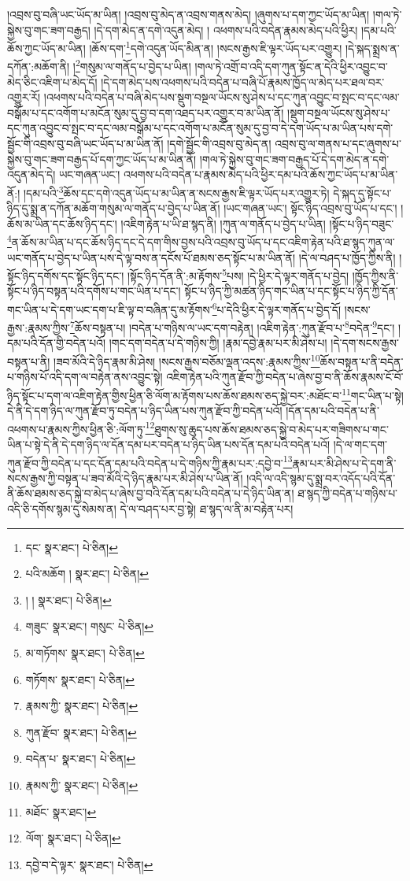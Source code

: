 །འབྲས་བུ་བཞི་ཡང་ཡོད་མ་ཡིན། །འབྲས་བུ་མེད་ན་འབྲས་གནས་མེད། །ཞུགས་པ་དག་ཀྱང་ཡོད་མ་ཡིན། །གལ་ཏེ་སྐྱེས་བུ་གང་ཟག་བརྒྱད། །དེ་དག་མེད་ན་དགེ་འདུན་མེད། །
འཕགས་པའི་བདེན་རྣམས་མེད་པའི་ཕྱིར། །དམ་པའི་ཆོས་ཀྱང་ཡོད་མ་ཡིན། །ཆོས་དག་\footnote{དང་  སྣར་ཐང་།  པེ་ཅིན། }དགེ་འདུན་ཡོད་མིན་ན། །སངས་རྒྱས་ཇི་ལྟར་ཡོད་པར་འགྱུར། །དེ་སྐད་སྨྲས་ན་དཀོན་:མཆོག་ནི། །\footnote{པའི་མཆོག །  སྣར་ཐང་།  པེ་ཅིན། }གསུམ་ལ་གནོད་པ་བྱེད་པ་ཡིན། །གལ་ཏེ་འགྲོ་བ་འདི་དག་ཀུན་སྟོང་ན་དེའི་ཕྱིར་འབྱུང་བ་མེད་ཅིང་འཇིག་པ་མེད་དོ། །དེ་དག་མེད་པས་འཕགས་པའི་བདེན་པ་བཞི་པོ་རྣམས་ཁྱོད་ལ་མེད་པར་ཐལ་བར་འགྱུར་རོ། །འཕགས་པའི་བདེན་པ་བཞི་མེད་པས་སྡུག་བསྔལ་ཡོངས་སུ་ཤེས་པ་དང་ཀུན་འབྱུང་བ་སྤང་བ་དང་ལམ་བསྒོམ་པ་དང་འགོག་པ་མངོན་སུམ་དུ་བྱ་བ་དག་འཐད་པར་འགྱུར་བ་མ་ཡིན་ནོ། །སྡུག་བསྔལ་ཡོངས་སུ་ཤེས་པ་དང་ཀུན་འབྱུང་བ་སྤང་བ་དང་ལམ་བསྒོམ་པ་དང་འགོག་པ་མངོན་སུམ་དུ་བྱ་བ་དེ་དག་ཡོད་པ་མ་ཡིན་པས་དགེ་སྦྱོང་གི་འབྲས་བུ་བཞི་ཡང་ཡོད་པ་མ་ཡིན་ནོ། །དགེ་སྦྱོང་གི་འབྲས་བུ་མེད་ན། འབྲས་བུ་ལ་གནས་པ་དང་ཞུགས་པ་སྐྱེས་བུ་གང་ཟག་བརྒྱད་པོ་དག་ཀྱང་ཡོད་པ་མ་ཡིན་ནོ། །གལ་ཏེ་སྐྱེས་བུ་གང་ཟག་བརྒྱད་པོ་དེ་དག་མེད་ན་དགེ་འདུན་མེད་དེ། ཡང་གཞན་ཡང་། འཕགས་པའི་བདེན་པ་རྣམས་མེད་པའི་ཕྱིར་དམ་པའི་ཆོས་ཀྱང་ཡོད་པ་མ་ཡིན་ནོ:། །དམ་པའི་\footnote{། །  སྣར་ཐང་།  པེ་ཅིན། }ཆོས་དང་དགེ་འདུན་ཡོད་པ་མ་ཡིན་ན་སངས་རྒྱས་ཇི་ལྟར་ཡོད་པར་འགྱུར་ཏེ། དེ་སྐད་དུ་སྟོང་པ་ཉིད་དུ་སྨྲ་ན་དཀོན་མཆོག་གསུམ་ལ་གནོད་པ་བྱེད་པ་ཡིན་ནོ། །ཡང་གཞན་ཡང་། སྟོང་ཉིད་འབྲས་བུ་ཡོད་པ་དང་། །ཆོས་མ་ཡིན་དང་ཆོས་ཉིད་དང་། །འཇིག་རྟེན་པ་ཡི་ཐ་སྙད་ནི། །ཀུན་ལ་གནོད་པ་བྱེད་པ་ཡིན། །སྟོང་པ་ཉིད་བཟུང་\footnote{གཟུང་  སྣར་ཐང་། གསུང་  པེ་ཅིན། }ན་ཆོས་མ་ཡིན་པ་དང་ཆོས་ཉིད་དང་དེ་དག་གིས་བྱས་པའི་འབྲས་བུ་ཡོད་པ་དང་འཇིག་རྟེན་པའི་ཐ་སྙད་ཀུན་ལ་ཡང་གནོད་པ་བྱེད་པ་ཡིན་པས་དེ་ལྟ་བས་ན་དངོས་པོ་ཐམས་ཅད་སྟོང་པ་མ་ཡིན་ནོ། །དེ་ལ་བཤད་པ་ཁྱོད་ཀྱིས་ནི། །སྟོང་ཉིད་དགོས་དང་སྟོང་ཉིད་དང་། །སྟོང་ཉིད་དོན་ནི་:མ་རྟོགས་\footnote{མ་གཏོགས་  སྣར་ཐང་།  པེ་ཅིན། }པས། །དེ་ཕྱིར་དེ་ལྟར་གནོད་པ་བྱེད། །ཁྱོད་ཀྱིས་ནི་སྟོང་པ་ཉིད་བསྟན་པའི་དགོས་པ་གང་ཡིན་པ་དང་། སྟོང་པ་ཉིད་ཀྱི་མཚན་ཉིད་གང་ཡིན་པ་དང་སྟོང་པ་ཉིད་ཀྱི་དོན་གང་ཡིན་པ་དེ་དག་ཡང་དག་པ་ཇི་ལྟ་བ་བཞིན་དུ་མ་རྟོགས་\footnote{གཏོགས་  སྣར་ཐང་།  པེ་ཅིན། }པ་དེའི་ཕྱིར་དེ་ལྟར་གནོད་པ་བྱེད་དོ། །སངས་རྒྱས་:རྣམས་ཀྱིས་\footnote{རྣམས་ཀྱི་  སྣར་ཐང་།  པེ་ཅིན། }ཆོས་བསྟན་པ། །བདེན་པ་གཉིས་ལ་ཡང་དག་བརྟེན། །འཇིག་རྟེན་:ཀུན་རྫོབ་པ་\footnote{ཀུན་རྫོབ་  སྣར་ཐང་།  པེ་ཅིན། }བདེན་\footnote{བདེན་པ་  སྣར་ཐང་།  པེ་ཅིན། }དང་། །དམ་པའི་དོན་གྱི་བདེན་པའོ། །གང་དག་བདེན་པ་དེ་གཉིས་ཀྱི། །རྣམ་དབྱེ་རྣམ་པར་མི་ཤེས་པ། །དེ་དག་སངས་རྒྱས་བསྟན་པ་ནི། །ཟབ་མོའི་དེ་ཉིད་རྣམ་མི་ཤེས། །སངས་རྒྱས་བཅོམ་ལྡན་འདས་:རྣམས་ཀྱིས་\footnote{རྣམས་ཀྱི་  སྣར་ཐང་།  པེ་ཅིན། }ཆོས་བསྟན་པ་ནི་བདེན་པ་གཉིས་པོ་འདི་དག་ལ་བརྟེན་ནས་འབྱུང་སྟེ། འཇིག་རྟེན་པའི་ཀུན་རྫོབ་ཀྱི་བདེན་པ་ཞེས་བྱ་བ་ནི་ཆོས་རྣམས་ངོ་བོ་ཉིད་སྟོང་པ་དག་ལ་འཇིག་རྟེན་གྱིས་ཕྱིན་ཅི་ལོག་མ་རྟོགས་པས་ཆོས་ཐམས་ཅད་སྐྱེ་བར་:མཐོང་བ་\footnote{མཐོང་  སྣར་ཐང་། }གང་ཡིན་པ་སྟེ། དེ་ནི་དེ་དག་ཉིད་ལ་ཀུན་རྫོབ་ཏུ་བདེན་པ་ཉིད་ཡིན་པས་ཀུན་རྫོབ་ཀྱི་བདེན་པའོ། །དོན་དམ་པའི་བདེན་པ་ནི་འཕགས་པ་རྣམས་ཀྱིས་ཕྱིན་ཅི་:ལོག་ཏུ་\footnote{ལོག་  སྣར་ཐང་།  པེ་ཅིན། }ཐུགས་སུ་ཆུད་པས་ཆོས་ཐམས་ཅད་སྐྱེ་བ་མེད་པར་གཟིགས་པ་གང་ཡིན་པ་སྟེ་དེ་ནི་དེ་དག་ཉིད་ལ་དོན་དམ་པར་བདེན་པ་ཉིད་ཡིན་པས་དོན་དམ་པའི་བདེན་པའོ། །དེ་ལ་གང་དག་ཀུན་རྫོབ་ཀྱི་བདེན་པ་དང་དོན་དམ་པའི་བདེན་པ་དེ་གཉིས་ཀྱི་རྣམ་པར་:དབྱེ་བ་\footnote{དབྱེ་བ་དེ་ལྟར་  སྣར་ཐང་།  པེ་ཅིན། }རྣམ་པར་མི་ཤེས་པ་དེ་དག་ནི་སངས་རྒྱས་ཀྱི་བསྟན་པ་ཟབ་མོའི་དེ་ཉིད་རྣམ་པར་མི་ཤེས་པ་ཡིན་ནོ། །འདི་ལ་འདི་སྙམ་དུ་སྨྲ་བར་འདོད་པའི་དོན་ནི་ཆོས་ཐམས་ཅད་སྐྱེ་བ་མེད་པ་ཞེས་བྱ་བའི་དོན་དམ་པའི་བདེན་པ་དེ་ཉིད་ཡིན་ན། ཐ་སྙད་ཀྱི་བདེན་པ་གཉིས་པ་འདི་ཅི་དགོས་སྙམ་དུ་སེམས་ན། དེ་ལ་བཤད་པར་བྱ་སྟེ། ཐ་སྙད་ལ་ནི་མ་བརྟེན་པར། 